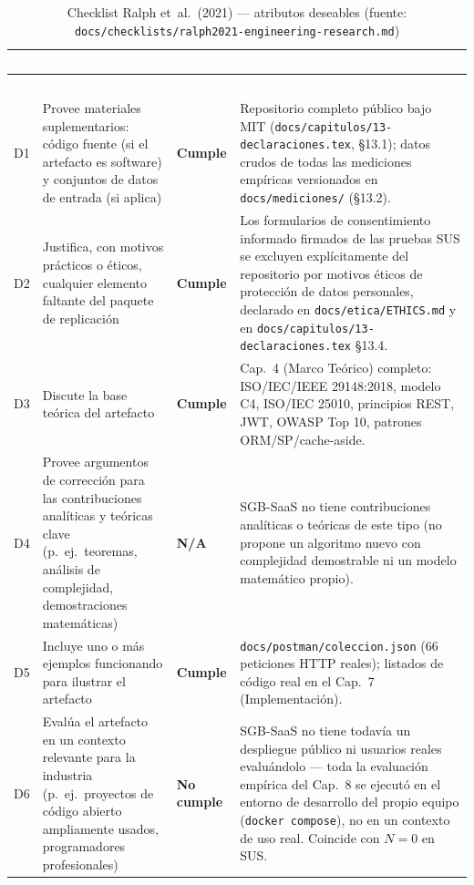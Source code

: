 \begin{center}
\scriptsize
\renewcommand{\arraystretch}{1.15}
\begin{longtable}{|p{0.7cm}|p{4.2cm}|p{1.6cm}|p{7.0cm}|}
\caption{Checklist Ralph et~al.\ (2021) --- atributos deseables
  (fuente: \texttt{docs/checklists/ralph2021-engineering-research.md})}
\label{tab:anexo-ralph-deseables}\\
\hline
\rowcolor{verdeuteq}
\textcolor{white}{\textbf{\#}} &
\textcolor{white}{\textbf{Ítem}} &
\textcolor{white}{\textbf{Estado}} &
\textcolor{white}{\textbf{Evidencia / nota}} \\
\hline
\endfirsthead
\hline
\rowcolor{verdeuteq}
\textcolor{white}{\textbf{\#}} &
\textcolor{white}{\textbf{Ítem}} &
\textcolor{white}{\textbf{Estado}} &
\textcolor{white}{\textbf{Evidencia / nota}} \\
\hline
\endhead
\hline
\endfoot
D1 & Provee materiales suplementarios: código fuente (si el artefacto es software) y conjuntos de datos de entrada (si aplica) & \textbf{Cumple} & Repositorio completo público bajo MIT (\texttt{docs/capitulos/13-declaraciones.tex}, §13.1); datos crudos de todas las mediciones empíricas versionados en \texttt{docs/mediciones/} (§13.2). \\
\hline
D2 & Justifica, con motivos prácticos o éticos, cualquier elemento faltante del paquete de replicación & \textbf{Cumple} & Los formularios de consentimiento informado firmados de las pruebas SUS se excluyen explícitamente del repositorio por motivos éticos de protección de datos personales, declarado en \texttt{docs/etica/ETHICS.md} y en \texttt{docs/capitulos/13-declaraciones.tex} §13.4. \\
\hline
D3 & Discute la base teórica del artefacto & \textbf{Cumple} & Cap.\ 4 (Marco Teórico) completo: ISO/IEC/IEEE 29148:2018, modelo C4, ISO/IEC 25010, principios REST, JWT, OWASP Top 10, patrones ORM/SP/cache-aside. \\
\hline
D4 & Provee argumentos de corrección para las contribuciones analíticas y teóricas clave (p.\ ej.\ teoremas, análisis de complejidad, demostraciones matemáticas) & \textbf{N/A} & SGB-SaaS no tiene contribuciones analíticas o teóricas de este tipo (no propone un algoritmo nuevo con complejidad demostrable ni un modelo matemático propio). \\
\hline
D5 & Incluye uno o más ejemplos funcionando para ilustrar el artefacto & \textbf{Cumple} & \texttt{docs/postman/coleccion.json} (66 peticiones HTTP reales); listados de código real en el Cap.\ 7 (Implementación). \\
\hline
D6 & Evalúa el artefacto en un contexto relevante para la industria (p.\ ej.\ proyectos de código abierto ampliamente usados, programadores profesionales) & \textbf{No cumple} & SGB-SaaS no tiene todavía un despliegue público ni usuarios reales evaluándolo --- toda la evaluación empírica del Cap.\ 8 se ejecutó en el entorno de desarrollo del propio equipo (\texttt{docker compose}), no en un contexto de uso real. Coincide con $N=0$ en SUS. \\
\hline
\end{longtable}
\end{center}


